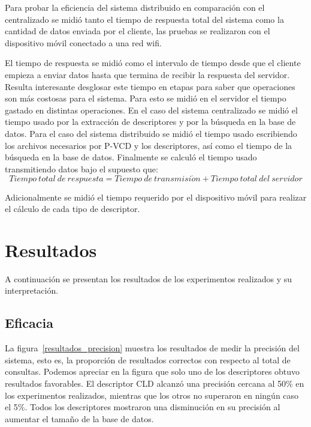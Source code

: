 Para probar la eficiencia del sistema distribuido en comparación con el centralizado se midió tanto el tiempo de respuesta total del sistema como la cantidad de datos enviada por el cliente, las pruebas se realizaron con el dispositivo móvil conectado a una red wifi. 

El tiempo de respuesta se midió como el intervalo de tiempo desde que el cliente empieza a enviar datos hasta que termina de recibir la respuesta del servidor. Resulta interesante desglosar este tiempo en etapas para saber que operaciones son más costosas para el sistema. Para esto se midió en el servidor el tiempo gastado en distintas operaciones. En el caso del sistema centralizado se midió el tiempo usado por la extracción de descriptores y por la búsqueda en la base de datos. Para el caso del sistema distribuido se midió el tiempo usado escribiendo los archivos necesarios por P-VCD y los descriptores, así como el tiempo de la búsqueda en la base de datos. Finalmente se calculó el tiempo usado transmitiendo datos bajo el supuesto que:
\begin{equation*}
\displaystyle{Tiempo\ total\ de\ respuesta}  =  \displaystyle{Tiempo\ de\ transmisi\acute{o}n} + \displaystyle{Tiempo\ total\ del\ servidor} 
\end{equation*}

Adicionalmente se midió el tiempo requerido por el dispositivo móvil para realizar el cálculo de cada tipo de descriptor.

\section{Resultados}\label{resultados}
A continuación se presentan los resultados de los experimentos realizados y su interpretación. 

\subsection{Eficacia}

La figura~\ref{resultados_precision} muestra los resultados de medir la precisión del sistema, esto es, la proporción de resultados correctos con respecto al total de consultas. Podemos apreciar en la figura que  solo uno de los descriptores obtuvo resultados favorables. El descriptor CLD alcanzó una precisión cercana al 50\% en los experimentos realizados, mientras que los otros no superaron en ningún caso el 5\%. Todos los descriptores mostraron una disminución en su precisión al aumentar el tamaño de la base de datos.

